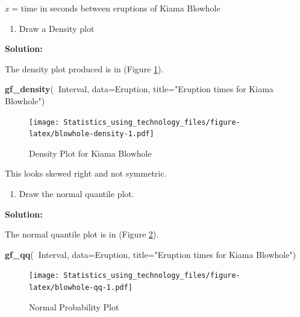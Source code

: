 \documentclass[]{book}
\newenvironment{Shaded}{\begin{snugshade}}{\end{snugshade}}
\newcommand{\DataTypeTok}[1]{\textcolor[rgb]{0.13,0.29,0.53}{#1}}
\newcommand{\KeywordTok}[1]{\textcolor[rgb]{0.13,0.29,0.53}{\textbf{#1}}}
\newcommand{\NormalTok}[1]{#1}
\newcommand{\OperatorTok}[1]{\textcolor[rgb]{0.81,0.36,0.00}{\textbf{#1}}}
\newcommand{\StringTok}[1]{\textcolor[rgb]{0.31,0.60,0.02}{#1}}
\providecommand{\tightlist}{%
  \setlength{\itemsep}{0pt}\setlength{\parskip}{0pt}}
\begin{document}
\emph{x} = time in seconds between eruptions of Kiama Blowhole

\begin{enumerate}
\def\labelenumi{\alph{enumi}.}
\setcounter{enumi}{1}
\tightlist
\item
  Draw a Density plot
\end{enumerate}

\textbf{Solution:}

The density plot produced is in (Figure \ref{fig:blowhole-density}).



\begin{Shaded}
\begin{Highlighting}[]
\KeywordTok{gf_density}\NormalTok{(}\OperatorTok{~}\NormalTok{Interval, }\DataTypeTok{data=}\NormalTok{Eruption, }\DataTypeTok{title=}\StringTok{"Eruption times for Kiama Blowhole"}\NormalTok{)}
\end{Highlighting}
\end{Shaded}

\begin{figure}
\centering
\texttt{[image: Statistics\_using\_technology\_files/figure-latex/blowhole-density-1.pdf]}
\caption{\label{fig:blowhole-density}Density Plot for Kiama Blowhole}
\end{figure}

This looks skewed right and not symmetric.

\begin{enumerate}
\def\labelenumi{\alph{enumi}.}
\setcounter{enumi}{2}
\tightlist
\item
  Draw the normal quantile plot.
\end{enumerate}

\textbf{Solution:}

The normal quantile plot is in (Figure \ref{fig:blowhole-qq}).



\begin{Shaded}
\begin{Highlighting}[]
\KeywordTok{gf_qq}\NormalTok{(}\OperatorTok{~}\NormalTok{Interval, }\DataTypeTok{data=}\NormalTok{Eruption, }\DataTypeTok{title=}\StringTok{"Eruption times for Kiama Blowhole"}\NormalTok{)}
\end{Highlighting}
\end{Shaded}

\begin{figure}
\centering
\texttt{[image: Statistics\_using\_technology\_files/figure-latex/blowhole-qq-1.pdf]}
\caption{\label{fig:blowhole-qq}Normal Probability Plot}
\end{figure}
\end{document}
